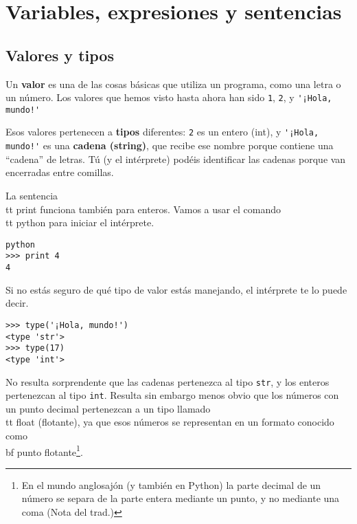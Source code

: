 
\chapter{Variables, expresiones y sentencias}

\section{Valores y tipos}

Un {\bf valor} es una de las cosas básicas que utiliza un programa,
como una letra o un número.
Los valores que hemos visto hasta ahora
han sido {\tt 1}, {\tt 2}, y
\verb"'¡Hola, mundo!'"

Esos valores pertenecen a {\bf tipos} diferentes:
{\tt 2} es un entero (int), y \verb"'¡Hola, mundo!'" es una {\bf cadena (string)},
que recibe ese nombre porque contiene una ``cadena'' de letras.
Tú (y el intérprete) podéis identificar
las cadenas porque van encerradas entre comillas.


La sentencia {\\tt print} funciona también para enteros. Vamos a usar el
comando {\\tt python} para iniciar el intérprete.

\beforeverb
\begin{verbatim}
python
>>> print 4
4
\end{verbatim}
\afterverb
%
Si no estás seguro de qué tipo de valor estás manejando, el intérprete te lo puede decir.

\beforeverb
\begin{verbatim}
>>> type('¡Hola, mundo!')
<type 'str'>
>>> type(17)
<type 'int'>
\end{verbatim}
\afterverb
%
No resulta sorprendente que las cadenas pertenezca al tipo {\tt str}, y los
enteros pertenezcan al tipo {\tt int}. Resulta sin embargo menos obvio
que los números con un punto decimal pertenezcan a un tipo llamado {\\tt float (flotante)},
ya que esos números se representan en un formato
conocido como {\\bf punto flotante}\footnote{En el mundo anglosajón (y también en Python)
la parte decimal de un número se separa de la parte entera mediante un punto, y no mediante una coma
(Nota del trad.)}.

